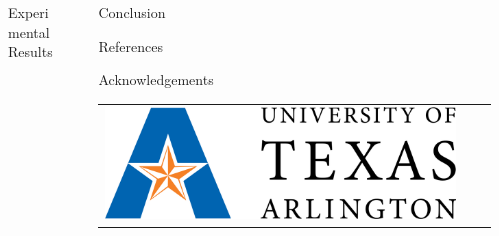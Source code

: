\documentclass[final]{beamer}
\newlength{\sepwid}
\newlength{\onecolwid}
\begin{document}
\begin{frame}[t]
\begin{columns}[t]
\begin{column}{\onecolwid}
\begin{block}{}
\rmfamily{
}
\end{block}

\begin{block}{Experimental Results}
\rmfamily{
}
\end{block}
\end{column}

\begin{column}{\sepwid}\end{column}  %
\begin{column}{\onecolwid}
\begin{block}{Conclusion}
\rmfamily{
}
\end{block}

\vspace{-0.5ex}
\begin{block}{References}
\small{}
\end{block}

\begin{block}{Acknowledgements}
{\rmfamily{
}}

\vspace{0.2in}
\begin{center}
\begin{tabular}{ccc}
\includegraphics[scale=0.5]{uta_logo.png} 
\end{tabular}
\end{center}
\end{block}
\end{column}
\begin{column}{\sepwid}\end{column}  %
\end{columns}
\end{frame}
\end{document}
